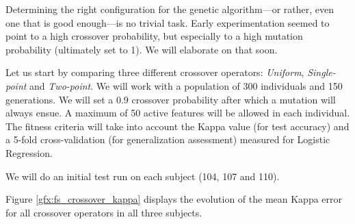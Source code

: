 	Determining the right configuration for the genetic algorithm---or rather, even one that is good enough---is no trivial task. Early experimentation seemed to point to a high crossover probability, but especially to a high mutation probability (ultimately set to 1). We will elaborate on that soon.

	Let us start by comparing three different crossover operators: \textit{Uniform}, \textit{Single-point} and \textit{Two-point}. We will work with a population of 300 individuals and 150 generations. We will set a 0.9 crossover probability after which a mutation will always ensue. A maximum of 50 active features will be allowed in each individual. The fitness criteria will take into account the Kappa value (for test accuracy) and a 5-fold cross-validation (for generalization assessment) measured for Logistic Regression.

	We will do an initial test run on each subject (104, 107 and 110). 

	Figure \ref{gfx:fs_crossover_kappa} displays the evolution of the mean Kappa error for all crossover operators in all three subjects.

